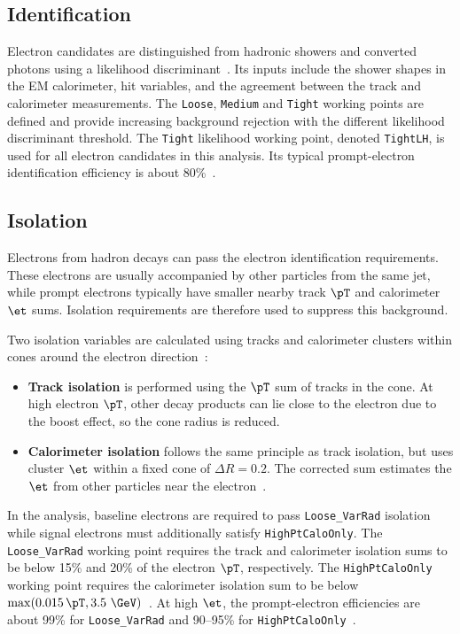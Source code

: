 \subsection{Identification}

Electron candidates are distinguished from hadronic showers and converted photons using a likelihood discriminant~\cite{ATLAS2019ElectronReco}.
Its inputs include the shower shapes in the EM calorimeter, hit variables, and the agreement between the track and calorimeter measurements.
The \texttt{Loose}, \texttt{Medium} and \texttt{Tight} working points are defined and provide increasing background rejection with the different likelihood discriminant threshold.
The \texttt{Tight} likelihood working point, denoted \texttt{TightLH}, is used for all electron candidates in this analysis.
Its typical prompt-electron identification efficiency is about 80\%~\cite{ATLAS2024ElectronPhotonEfficiencies}.

\subsection{Isolation}

Electrons from hadron decays can pass the electron identification requirements.
These electrons are usually accompanied by other particles from the same jet, while prompt electrons typically have smaller nearby track $\pT$ and calorimeter $\et$ sums.
Isolation requirements are therefore used to suppress this background.

Two isolation variables are calculated using tracks and calorimeter clusters within cones around the electron direction~\cite{ATLAS2019ElectronPerformance}:
\begin{itemize}
    \item \textbf{Track isolation} is performed using the $\pT$ sum of tracks in the cone. At high electron $\pT$, other decay products can lie close to the electron due to the boost effect, so the cone radius is reduced.
    \item \textbf{Calorimeter isolation} follows the same principle as track isolation, but uses cluster $\et$ within a fixed cone of $\Delta R=0.2$. The corrected sum estimates the $\et$ from other particles near the electron~\cite{ATLAS2019ElectronPerformance}.
\end{itemize}
In the analysis, baseline electrons are required to pass \texttt{Loose\_VarRad} isolation while signal electrons must additionally satisfy \texttt{HighPtCaloOnly}.
The \texttt{Loose\_VarRad} working point requires the track and calorimeter isolation sums to be below 15\% and 20\% of the electron $\pT$, respectively.
The \texttt{HighPtCaloOnly} working point requires the calorimeter isolation sum to be below $\max(0.015\,\pT,3.5~\GeV)$~\cite{ATLAS2019ElectronPerformance}.
At high $\et$, the prompt-electron efficiencies are about 99\% for \texttt{Loose\_VarRad} and 90--95\% for \texttt{HighPtCaloOnly}~\cite{ATLAS2024ElectronPhotonEfficiencies}.

